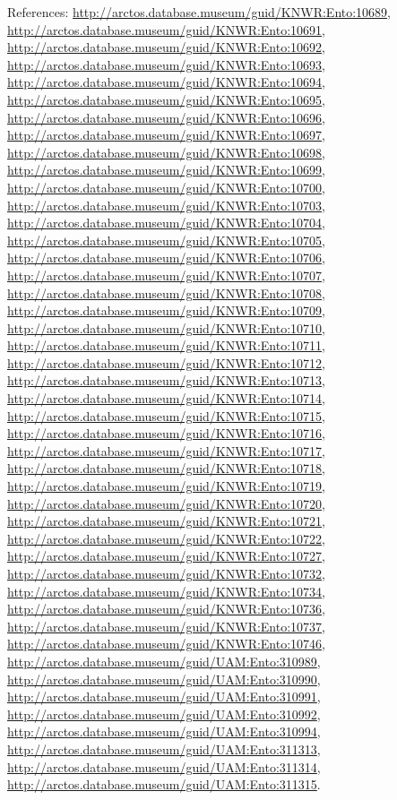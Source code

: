 \documentclass[9pt, article]{memoir}
\begin{document}
\begin{multicols}{2}
References: 
\url{http://arctos.database.museum/guid/KNWR:Ento:10689}, 
\url{http://arctos.database.museum/guid/KNWR:Ento:10691}, 
\url{http://arctos.database.museum/guid/KNWR:Ento:10692}, 
\url{http://arctos.database.museum/guid/KNWR:Ento:10693}, 
\url{http://arctos.database.museum/guid/KNWR:Ento:10694}, 
\url{http://arctos.database.museum/guid/KNWR:Ento:10695}, 
\url{http://arctos.database.museum/guid/KNWR:Ento:10696}, 
\url{http://arctos.database.museum/guid/KNWR:Ento:10697}, 
\url{http://arctos.database.museum/guid/KNWR:Ento:10698}, 
\url{http://arctos.database.museum/guid/KNWR:Ento:10699}, 
\url{http://arctos.database.museum/guid/KNWR:Ento:10700}, 
\url{http://arctos.database.museum/guid/KNWR:Ento:10703}, 
\url{http://arctos.database.museum/guid/KNWR:Ento:10704}, 
\url{http://arctos.database.museum/guid/KNWR:Ento:10705}, 
\url{http://arctos.database.museum/guid/KNWR:Ento:10706}, 
\url{http://arctos.database.museum/guid/KNWR:Ento:10707}, 
\url{http://arctos.database.museum/guid/KNWR:Ento:10708}, 
\url{http://arctos.database.museum/guid/KNWR:Ento:10709}, 
\url{http://arctos.database.museum/guid/KNWR:Ento:10710}, 
\url{http://arctos.database.museum/guid/KNWR:Ento:10711}, 
\url{http://arctos.database.museum/guid/KNWR:Ento:10712}, 
\url{http://arctos.database.museum/guid/KNWR:Ento:10713}, 
\url{http://arctos.database.museum/guid/KNWR:Ento:10714}, 
\url{http://arctos.database.museum/guid/KNWR:Ento:10715}, 
\url{http://arctos.database.museum/guid/KNWR:Ento:10716}, 
\url{http://arctos.database.museum/guid/KNWR:Ento:10717}, 
\url{http://arctos.database.museum/guid/KNWR:Ento:10718}, 
\url{http://arctos.database.museum/guid/KNWR:Ento:10719}, 
\url{http://arctos.database.museum/guid/KNWR:Ento:10720}, 
\url{http://arctos.database.museum/guid/KNWR:Ento:10721}, 
\url{http://arctos.database.museum/guid/KNWR:Ento:10722}, 
\url{http://arctos.database.museum/guid/KNWR:Ento:10727}, 
\url{http://arctos.database.museum/guid/KNWR:Ento:10732}, 
\url{http://arctos.database.museum/guid/KNWR:Ento:10734}, 
\url{http://arctos.database.museum/guid/KNWR:Ento:10736}, 
\url{http://arctos.database.museum/guid/KNWR:Ento:10737}, 
\url{http://arctos.database.museum/guid/KNWR:Ento:10746}, 
\url{http://arctos.database.museum/guid/UAM:Ento:310989}, 
\url{http://arctos.database.museum/guid/UAM:Ento:310990}, 
\url{http://arctos.database.museum/guid/UAM:Ento:310991}, 
\url{http://arctos.database.museum/guid/UAM:Ento:310992}, 
\url{http://arctos.database.museum/guid/UAM:Ento:310994}, 
\url{http://arctos.database.museum/guid/UAM:Ento:311313}, 
\url{http://arctos.database.museum/guid/UAM:Ento:311314}, 
\url{http://arctos.database.museum/guid/UAM:Ento:311315}.


\end{multicols}
\end{document}
